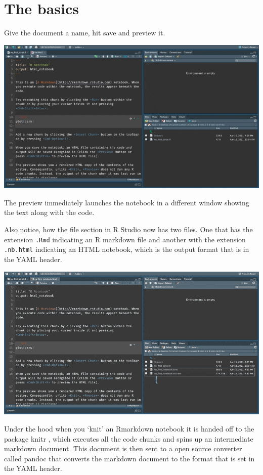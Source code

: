 \documentclass[
]{book}
\begin{document}
\hypertarget{the-basics}{%
\section{The basics}\label{the-basics}}

Give the document a name, hit save and preview it.

\includegraphics{assets/ch_2-notebooks/gifs/save_preview.gif}

The preview immediately launches the notebook in a different window showing the text along with the code.

Also notice, how the file section in R Studio now has two files. One that has the extension \texttt{.Rmd} indicating an R markdown file and another with the extension \texttt{.nb.html} indicating an HTML notebook, which is the output format that is in the YAML header.

\includegraphics{assets/ch_2-notebooks/gifs/two_files.gif}

Under the hood when you `knit' an Rmarkdown notebook it is handed off to the package knitr \citep{R-knitr} , which executes all the code chunks and spins up an intermediate markdown document. This document is then sent to a open source converter called pandoc that converts the markdown document to the format that is set in the YAML header. \citep{hadley2017}
\end{document}
